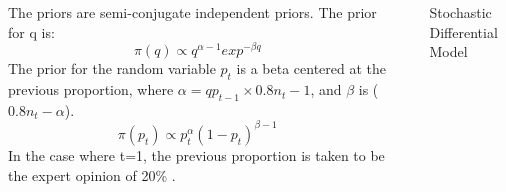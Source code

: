 \documentclass[final]{beamer}
\newlength{\sepwid}
\newlength{\onecolwid}
\newlength{\threecolwid}
\begin{document}
\begin{frame}[t]
\begin{columns}[t]
\begin{column}{\onecolwid}
      		\begin{tcolorbox}[enhanced,attach boxed title to top center={yshift=-3mm,yshifttext=-1mm},
  colback=White,colframe=DarkViolet,colbacktitle=Violet,
      			title=\textbf{Priors},fonttitle=\bfseries,
      			boxed title style={colframe=Violet} ]
      			\small
      		 	The priors are semi-conjugate independent priors. The prior for q is:
      		 	\vspace{-.5cm}
      			$$\pi(q) \propto q^{\alpha-1}exp^{-\beta q}$$
      			The prior for the random variable $p_{t}$ is a beta centered at the previous proportion, where $\alpha = q p_{t-1}\times 0.8 n_t-1$, and $\beta$ is ($0.8n_t-\alpha$). 
      				\vspace{-.5cm}
      			$$\pi(p_{t}) \propto p_t^{\alpha }(1-p_t)^{\beta-1}$$
      		In the case where t=1, the previous proportion is taken to be the expert opinion of 20\% \cite{pinkerton}.
      		
      		\end{tcolorbox}
      
      

    \end{column}


    \begin{column}{\sepwid}\end{column}			%
    \begin{column}{\threecolwid}	
    	\vspace{-1cm}				  %
    

        \begin{tcolorbox}[enhanced,sharp corners=uphill,
      	colframe=Violet,coltext=White,interior style={left color=Blue,right color=DeepPink},
      	fontupper=\Large\bfseries,arc=6mm,boxrule=2mm,boxsep=5mm,	boxed title style={colframe=Blue} ,
      	borderline={0.3mm}{0.3mm}{White}]
      	Stochastic Differential Model
      \end{tcolorbox}
      

\end{column}
\end{columns}
\end{frame}
\end{document}
